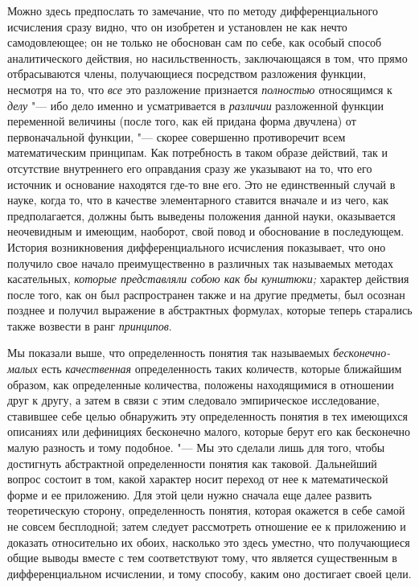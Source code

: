 Можно здесь предпослать то замечание, что по методу дифференциального
исчисления сразу видно, что он изобретен и установлен не как нечто
самодовлеющее; он не только не обоснован сам по себе, как особый способ
аналитического действия, но насильственность, заключающаяся в том, что прямо
отбрасываются члены, получающиеся посредством разложения функции, несмотря на
то, что {\em все} это разложение признается {\em полностью} относящимся к
{\em делу} "--- ибо дело именно и усматривается в {\em различии} разложенной
функции переменной величины (после того, как ей придана форма двучлена) от
первоначальной функции, "--- скорее совершенно противоречит всем математическим
принципам. Как потребность в таком образе действий, так и отсутствие
внутреннего его оправдания сразу же указывают на то, что его источник и
основание находятся где-то вне его. Это не единственный случай в науке, когда
то, что в качестве элементарного ставится вначале и из чего, как
предполагается, должны быть выведены положения данной науки, оказывается
неочевидным и имеющим, наоборот, свой повод и обоснование в последующем.
История возникновения дифференциального исчисления показывает, что оно получило
свое начало преимущественно в различных так называемых методах касательных,
{\em которые представляли собою как бы кунштюки;} характер действия после того,
как он был распространен также и на другие предметы, был осознан позднее и
получил выражение в абстрактных формулах, которые теперь старались также
возвести в ранг {\em принципов}.

Мы показали выше, что определенность понятия так называемых
{\em бесконечно-малых} есть {\em качественная} определенность таких количеств,
которые ближайшим образом, как определенные количества, положены находящимися в
отношении друг к другу, а затем в связи с этим следовало эмпирическое
исследование, ставившее себе целью обнаружить эту определенность понятия в тех
имеющихся описаниях или дефинициях бесконечно малого, которые берут его как
бесконечно малую разность и тому подобное. "--- Мы это сделали лишь для того,
чтобы достигнуть абстрактной определенности понятия как таковой. Дальнейший
вопрос состоит в том, какой характер носит переход от нее к математической
форме и ее приложению. Для этой цели нужно сначала еще далее развить
теоретическую сторону, определенность понятия, которая окажется в себе самой не
совсем бесплодной; затем следует рассмотреть отношение ее к приложению и
доказать относительно их обоих, насколько это здесь уместно, что получающиеся
общие выводы вместе с тем соответствуют тому, что является существенным в
дифференциальном исчислении, и тому способу, каким оно достигает своей цели.

